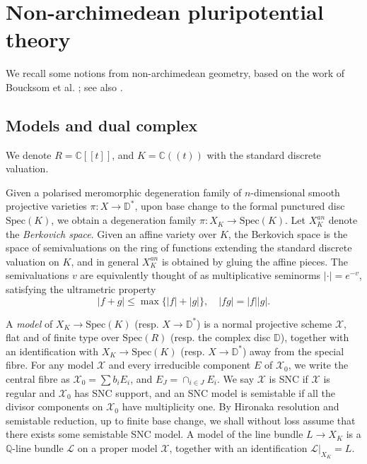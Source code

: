 \documentclass[a4paper]{article}
\theoremstyle{definition}
\newcommand{\C}{\mathbb{C}}
\newcommand{\Q}{\mathbb{Q}}
\begin{document}
	
	
	

	
	
	
	
	
	\section{Non-archimedean pluripotential theory}\label{sec:NA}
	
	
	
	
		We recall some notions from non-archimedean geometry, based on the work of Boucksom et al. \cite{Boucksom, Boucksom1, Boucksomnew1, Boucksomsemipositive, Boucksomsurvey}; see also \cite[section 5]{Boucksom1}\cite[section 2]{Liintermediate}. 
	
	
	
	
	
	\subsection{Models and dual complex}
	
	
	
	We denote $R=\C[\![ t ]\!]$, and $K=\C(\!(t)\!)$ with the standard discrete valuation. 
	
	
	
	
	
	
	
	
	
	Given a polarised meromorphic degeneration family of $n$-dimensional smooth projective varieties $\pi: X\to \mathbb{D}^*$, upon base change to the formal punctured disc $\text{Spec}(K)$, we obtain a degeneration family $\pi: X_K\to \text{Spec}(K)$.  Let $X_K^{an}$ denote the  \emph{Berkovich space}. Given an affine variety over $K$, the Berkovich space is the space of semivaluations on the ring of functions extending the standard discrete valuation on $K$, and in general $X_K^{an}$ is obtained by gluing the affine pieces.	The semivaluations $v$ are equivalently thought of as multiplicative seminorms $|\cdot |=e^{-v}$, satisfying the ultrametric property
	\[
	|f+g|\leq \max\{ |f|+|g|  \}, \quad |fg|=|f||g|.
	\]
	
	
	
	
	
	
	A \emph{model} of $X_K\to \text{Spec}(K)$ (resp. $X\to \mathbb{D}^*$) is a normal projective scheme $\mathcal{X}$, flat and of finite type over $\text{Spec}(R)$ (resp. the complex disc $\mathbb{D}$), together with an identification with $X_K\to \text{Spec}(K)$ (resp. $X\to \mathbb{D}^*$) away from the special fibre. For any model $\mathcal{X}$ and every irreducible component $E$ of $\mathcal{X}_0$, we write the central fibre as $\mathcal{X}_0=\sum b_iE_i$, and $E_J= \cap_{i\in J}E_i$. We say $\mathcal{X}$ is SNC if $\mathcal{X}$ is regular and $\mathcal{X}_0$ has SNC support, and an SNC model is semistable if all the divisor components on $\mathcal{X}_0$ have multiplicity one. By Hironaka resolution and semistable reduction, up to finite base change, we shall without loss assume that there exists some semistable SNC model. A model of the line bundle $L\to X_K$ is a $\Q$-line bundle $\mathcal{L}$ on a proper model $\mathcal{X}$, together with an identification $\mathcal{L}|_{X_K}=L$.
	
\end{document}
